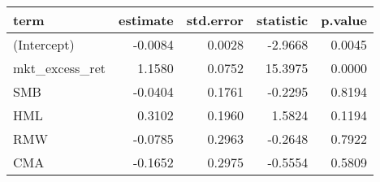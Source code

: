 \begin{table}[ht]
\centering
\begin{tabular}{lrrrr}
  \hline
term & estimate & std.error & statistic & p.value \\ 
  \hline
(Intercept) & -0.0084 & 0.0028 & -2.9668 & 0.0045 \\ 
  mkt\_excess\_ret & 1.1580 & 0.0752 & 15.3975 & 0.0000 \\ 
  SMB & -0.0404 & 0.1761 & -0.2295 & 0.8194 \\ 
  HML & 0.3102 & 0.1960 & 1.5824 & 0.1194 \\ 
  RMW & -0.0785 & 0.2963 & -0.2648 & 0.7922 \\ 
  CMA & -0.1652 & 0.2975 & -0.5554 & 0.5809 \\ 
   \hline
\end{tabular}
\end{table}

